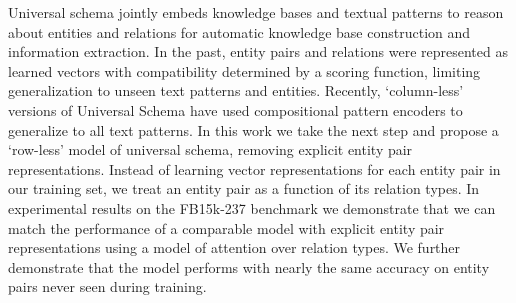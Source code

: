 Universal schema jointly embeds knowledge bases and textual patterns to reason about entities and relations for automatic knowledge base construction and information extraction. In the past, entity pairs and relations were represented as learned vectors with compatibility determined by a scoring function, limiting generalization to unseen text patterns and entities. Recently, `column-less' versions of Universal Schema have used compositional pattern encoders to generalize to all text patterns. In this work we take the next step and propose a `row-less' model of universal schema, removing explicit entity pair representations. Instead of learning vector representations for each entity pair in our training set, we treat an entity pair as a function of its relation types. In experimental results on the FB15k-237 benchmark we demonstrate that we can match the performance of a comparable model with explicit entity pair representations using a model of attention over relation types. We further demonstrate that the model performs with nearly the same accuracy on entity pairs never seen during training.
